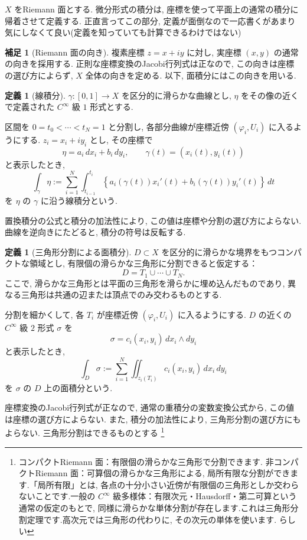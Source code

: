 \documentclass[dvipdfmx,a4paper,11pt]{article} %
\theoremstyle{definition}
\numberwithin{equation}{section}
\newtheorem{dfn}[thm]{定義}
\newtheorem{rem}[thm]{補足}
\begin{document}
$X$ をRiemann 面とする.
微分形式の積分は, 座標を使って平面上の通常の積分に帰着させて定義する.
正直言ってこの部分, 定義が面倒なので一応書くがあまり気にしなくて良い(定義を知っていても計算できるわけではない)

\begin{rem}[Riemann 面の向き]
複素座標 $z=x+iy$ に対し, 実座標 $(x,y)$ の通常の向きを採用する.
正則な座標変換のJacobi行列式は正なので, 
この向きは座標の選び方によらず, $X$ 全体の向きを定める.
以下, 面積分にはこの向きを用いる.
\end{rem}

\begin{dfn}[線積分]\label{O-M117}
$\gamma:[0,1]\to X$ を区分的に滑らかな曲線とし, 
$\eta$ をその像の近くで定義された $C^\infty$ 級 $1$ 形式とする.

区間を $0=t_0<\cdots<t_N=1$ と分割し, 
各部分曲線が座標近傍 $(\varphi_i,U_i)$ に入るようにする.
$z_i=x_i+iy_i$ とし, その座標で
\[
\eta=a_i\,dx_i+b_i\,dy_i,\qquad
\gamma(t)=(x_i(t),y_i(t))
\]
と表示したとき, 
\[
\int_\gamma\eta
:=\sum_{i=1}^N\int_{t_{i-1}}^{t_i}
\left\{
a_i(\gamma(t))x_i'(t)+b_i(\gamma(t))y_i'(t)
\right\}\,dt
\]
を $\eta$ の $\gamma$ に沿う線積分という.
\end{dfn}

置換積分の公式と積分の加法性により, 
この値は座標や分割の選び方によらない.
曲線を逆向きにたどると, 積分の符号は反転する.

\begin{dfn}[三角形分割による面積分]\label{O-M118}
$D\subset X$ を区分的に滑らかな境界をもつコンパクトな領域とし, 
有限個の滑らかな三角形に分割できると仮定する：
\[
D=T_1\cup\cdots\cup T_N.
\]
ここで, 滑らかな三角形とは平面の三角形を滑らかに埋め込んだものであり, 
異なる三角形は共通の辺または頂点でのみ交わるものとする.

分割を細かくして, 各 $T_i$ が座標近傍 $(\varphi_i,U_i)$ に入るようにする.
$D$ の近くの $C^\infty$ 級 $2$ 形式 $\sigma$ を
\[
\sigma=c_i(x_i,y_i)\,dx_i\wedge dy_i
\]
と表示したとき, 
\[
\int_D\sigma
:=\sum_{i=1}^N
\iint_{z_i(T_i)}c_i(x_i,y_i)\,dx_i\,dy_i
\]
を $\sigma$ の $D$ 上の面積分という.
\end{dfn}

座標変換のJacobi行列式が正なので, 通常の重積分の変数変換公式から, 
この値は座標の選び方によらない.
また, 積分の加法性により, 三角形分割の選び方にもよらない.
三角形分割はできるものとする
\footnote{コンパクトRiemann 面：有限個の滑らかな三角形で分割できます.
非コンパクトRiemann 面：可算個の滑らかな三角形による, 局所有限な分割ができます.「局所有限」とは, 各点の十分小さい近傍が有限個の三角形としか交わらないことです.一般の \(C^\infty\) 級多様体：有限次元・Hausdorff・第二可算という通常の仮定のもとで, 同様に滑らかな単体分割が存在します.これは三角形分割定理です.高次元では三角形の代わりに, その次元の単体を使います. らしい}
\end{document}
